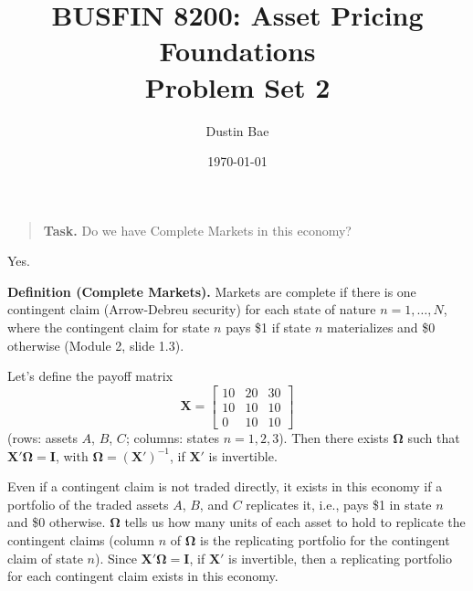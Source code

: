 \documentclass[11pt]{article}
\title{BUSFIN 8200: Asset Pricing Foundations\\Problem Set 2}
\author{Dustin Bae}
\date{\today}
\newcommand{\task}[1]{\begin{quote}\small\textbf{Task.} #1\end{quote}}
\begin{document}
\maketitle

%

\section{}\label{q1}

\subsection{}\label{q1a}
\task{Do we have Complete Markets in this economy?}
Yes.

\textbf{Definition (Complete Markets).} Markets are complete if there is one contingent claim
(Arrow-Debreu security) for each state of nature $n = 1, \dots, N$, where the contingent claim for
state $n$ pays \$1 if state $n$ materializes and \$0 otherwise (Module 2, slide 1.3).

Let's define the payoff matrix
\[
  \mathbf{X} = \begin{bmatrix} 10 & 20 & 30 \\ 10 & 10 & 10 \\ 0 & 10 & 10 \end{bmatrix}
\]
(rows: assets $A$, $B$, $C$; columns: states $n = 1, 2, 3$). Then there exists $\bm{\Omega}$ such
that $\mathbf{X}'\bm{\Omega} = \mathbf{I}$, with $\bm{\Omega} = (\mathbf{X}')^{-1}$, if $\mathbf{X}'$ is
invertible.

Even if a contingent claim is not traded directly, it exists in this economy if a portfolio of the traded
assets $A$, $B$, and $C$ replicates it, i.e., pays \$1 in state $n$ and \$0 otherwise. $\bm{\Omega}$ tells us
how many units of each asset to hold to replicate the contingent claims (column $n$
of $\bm{\Omega}$ is the replicating portfolio for the contingent claim of state $n$). Since
$\mathbf{X}'\bm{\Omega} = \mathbf{I}$, if $\mathbf{X}'$ is invertible, then a replicating portfolio for
each contingent claim exists in this economy.
\end{document}

